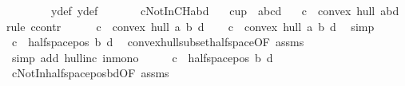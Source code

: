 \begin{isabellebody}
\ \ \ \ \ \ \ \ y{}{\isacharunderscore}{\kern0pt}def\ y{}{\isacharunderscore}{\kern0pt}def{\isacharparenright}{\kern0pt}\ \ \ \ \ \ \isanewline
{}\isamarkupfalse%
%
\endisatagproof
{\isafoldproof}%
%
\isadelimproof
\isanewline
%
\endisadelimproof
\isanewline
{}\isamarkupfalse%
\ cNotInCHabd{\isacharcolon}{\kern0pt}\isanewline
\ \ \ {\isachardoublequoteopen}cup\ {}\ {\isacharbrackleft}{\kern0pt}a{\isacharcomma}{\kern0pt}b{\isacharcomma}{\kern0pt}c{\isacharcomma}{\kern0pt}d{\isacharbrackright}{\kern0pt}{\isachardoublequoteclose}\isanewline
\ \ \ {\isachardoublequoteopen}c\ {\isasymnotin}\ convex\ hull\ {\isacharbraceleft}{\kern0pt}a{\isacharcomma}{\kern0pt}b{\isacharcomma}{\kern0pt}d{\isacharbraceright}{\kern0pt}{\isachardoublequoteclose}\isanewline
%
\isadelimproof
%
\endisadelimproof
%
\isatagproof
{}\isamarkupfalse%
{\isacharparenleft}{\kern0pt}rule\ ccontr{\isacharparenright}{\kern0pt}\isanewline
\ \ \isamarkupfalse%
\ {\isachardoublequoteopen}\ {\isasymnot}\ c\ {\isasymnotin}\ convex\ hull\ {\isacharbraceleft}{\kern0pt}a{\isacharcomma}{\kern0pt}\ b{\isacharcomma}{\kern0pt}\ d{\isacharbraceright}{\kern0pt}{\isachardoublequoteclose}\isanewline
\ \ \isamarkupfalse%
\ {\isachardoublequoteopen}c\ {\isasymin}\ convex\ hull\ {\isacharbraceleft}{\kern0pt}a{\isacharcomma}{\kern0pt}\ b{\isacharcomma}{\kern0pt}\ d{\isacharbraceright}{\kern0pt}{\isachardoublequoteclose}\ \isamarkupfalse%
\ simp\isanewline
\ \ \isamarkupfalse%
\ {\isachardoublequoteopen}c\ {\isasymin}\ halfspace{\isacharunderscore}{\kern0pt}pos\ b\ d{\isachardoublequoteclose}\ \isamarkupfalse%
\ convex{\isacharunderscore}{\kern0pt}hull{\isacharunderscore}{\kern0pt}subset{\isacharunderscore}{\kern0pt}halfspace{}{\isacharbrackleft}{\kern0pt}OF\ assms{\isacharbrackright}{\kern0pt}\ \isanewline
\ \ \ \ \isamarkupfalse%
\ {\isacharparenleft}{\kern0pt}simp\ add{\isacharcolon}{\kern0pt}\ hull{\isacharunderscore}{\kern0pt}inc\ in{\isacharunderscore}{\kern0pt}mono{\isacharparenright}{\kern0pt}\isanewline
\ \ \isamarkupfalse%
\ \isamarkupfalse%
\ {\isachardoublequoteopen}c\ {\isasymnotin}\ halfspace{\isacharunderscore}{\kern0pt}pos\ b\ d{\isachardoublequoteclose}\ \isamarkupfalse%
\ cNotInhalfspace{\isacharunderscore}{\kern0pt}pos{\isacharunderscore}{\kern0pt}bd{\isacharbrackleft}{\kern0pt}OF\ assms{\isacharbrackright}{\kern0pt}\ \isakeywordONE{{\isachardot}{\kern0pt}}\isamarkupfalse%

\end{isabellebody}
